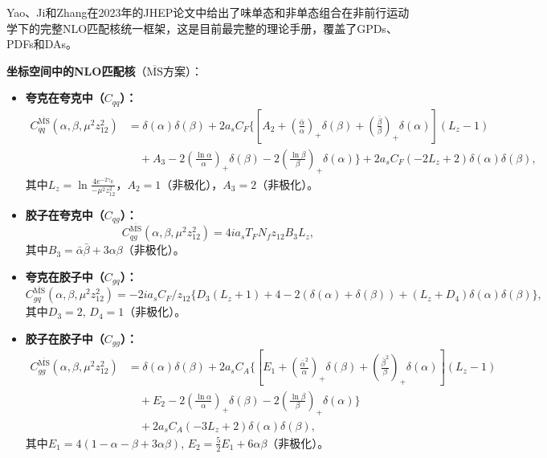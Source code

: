 \documentclass[12pt,a4paper]{ctexart}
\theoremstyle{definition}
\begin{document}
Yao、Ji和Zhang\cite{Yao2023}在2023年的JHEP论文中给出了味单态和非单态组合在非前行运动学下的完整NLO匹配核统一框架，这是目前最完整的理论手册，覆盖了GPDs、PDFs和DAs。

\textbf{坐标空间中的NLO匹配核}（$\overline{\text{MS}}$方案）\cite{Yao2023}：

\begin{itemize}
    \item \textbf{夸克在夸克中（$C_{qq}$）：}
    \begin{equation}
    \begin{aligned}
    C^{\overline{\text{MS}}}_{qq}(\alpha, \beta, \mu^2 z^2_{12}) &= \delta(\alpha)\delta(\beta) + 2a_s C_F \Bigg\{ \left[A_2 + \left(\frac{\bar{\alpha}}{\alpha}\right)_+ \delta(\beta) + \left(\frac{\bar{\beta}}{\beta}\right)_+ \delta(\alpha)\right](L_z - 1) \\
    &\quad + A_3 - 2\left(\frac{\ln\alpha}{\alpha}\right)_+ \delta(\beta) - 2\left(\frac{\ln\beta}{\beta}\right)_+ \delta(\alpha) \Bigg\} + 2a_s C_F (-2L_z + 2)\delta(\alpha)\delta(\beta),
    \end{aligned}
    \end{equation}
    其中$L_z = \ln\frac{4e^{-2\gamma_E}}{-\mu^2 z^2_{12}}$，$A_2=1$（非极化），$A_3=2$（非极化）。

    \item \textbf{胶子在夸克中（$C_{qg}$）：}
    \begin{equation}
    C^{\overline{\text{MS}}}_{qg}(\alpha, \beta, \mu^2 z^2_{12}) = 4i a_s T_F N_f z_{12} B_3 L_z,
    \end{equation}
    其中$B_3 = \bar{\alpha}\bar{\beta} + 3\alpha\beta$（非极化）。

    \item \textbf{夸克在胶子中（$C_{gq}$）：}
    \begin{equation}
    C^{\overline{\text{MS}}}_{gq}(\alpha, \beta, \mu^2 z^2_{12}) = -2i a_s C_F / z_{12} \Big\{ D_3(L_z + 1) + 4 - 2(\delta(\alpha) + \delta(\beta)) + (L_z + D_4)\delta(\alpha)\delta(\beta) \Big\},
    \end{equation}
    其中$D_3=2$, $D_4=1$（非极化）。

    \item \textbf{胶子在胶子中（$C_{gg}$）：}
    \begin{equation}
    \begin{aligned}
    C^{\overline{\text{MS}}}_{gg}(\alpha, \beta, \mu^2 z^2_{12}) &= \delta(\alpha)\delta(\beta) + 2a_s C_A \Bigg\{ \left[E_1 + \left(\frac{\bar{\alpha}^2}{\alpha}\right)_+ \delta(\beta) + \left(\frac{\bar{\beta}^2}{\beta}\right)_+ \delta(\alpha)\right](L_z - 1) \\
    &\quad + E_2 - 2\left(\frac{\ln\alpha}{\alpha}\right)_+ \delta(\beta) - 2\left(\frac{\ln\beta}{\beta}\right)_+ \delta(\alpha) \Bigg\} \\
    &\quad + 2a_s C_A (-3L_z + 2)\delta(\alpha)\delta(\beta),
    \end{aligned}
    \end{equation}
    其中$E_1 = 4(1-\alpha-\beta+3\alpha\beta)$, $E_2 = \frac{5}{2}E_1+6\alpha\beta$（非极化）。
\end{itemize}
\end{document}
